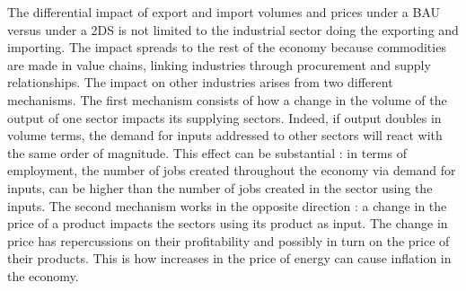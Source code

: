 \documentclass[12pt,english]{article}
\begin{document}
The differential impact of export and import volumes and prices under a BAU versus under a 2DS is not limited to the industrial sector doing the exporting and importing. The impact spreads to the rest of the economy because commodities are made in value chains, linking industries through procurement and supply relationships. The impact on other industries arises from two different mechanisms. The first mechanism consists of how a change in the volume of the output of one sector impacts its supplying sectors. Indeed, if output doubles in volume terms, the demand for inputs addressed to other sectors will react with the same order of magnitude. This effect can be substantial : in terms of employment, the number of jobs created throughout the economy via demand for inputs, can be higher than the number of jobs created in the sector using the inputs. The second mechanism works in the opposite direction : a change in the price of a product impacts the sectors using its product as input. The change in price has repercussions on their profitability and possibly in turn on the price of their products. This is how increases in the price of energy can cause inflation in the economy.

\end{document}
